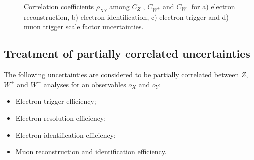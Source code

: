 \begin{figure}[!tbp]
\begin{minipage}[h]{0.49\linewidth}
\end{minipage}
\hfill
\begin{minipage}[h]{0.49\linewidth}
\end{minipage}
\vfill
\begin{minipage}[h]{0.49\linewidth}
\end{minipage}
\hfill
\begin{minipage}[h]{0.49\linewidth}
\end{minipage}

\caption{Correlation coefficients $\rho_{XY}$ among $C_{Z}$ , $C_{W^{+}}$ and $C_{W^{-}}$   for a) electron reconstruction, b) electron identification, c) electron trigger and d) muon trigger scale factor uncertainties.}
\label{fig:CorToy}
\end{figure}


\subsection{Treatment of partially correlated uncertainties}\label{sec:partCor}

The following uncertainties are considered to be partially correlated between $Z$, $W^{+}$ and $W^{-}$ analyses for an observables $o_X$ and $o_Y$:
\begin{itemize}
\item Electron trigger efficiency;
\item Electron resolution efficiency;
\item Electron identification efficiency;
\item Muon reconstruction and identification efficiency.
\end{itemize}

